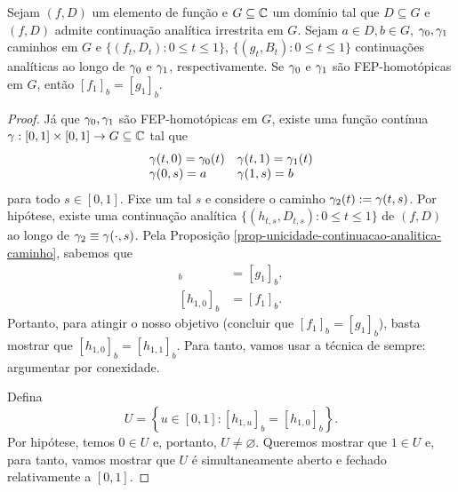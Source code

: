     \begin{teorema}
    \label{teo-monodromia}
        Sejam $(f,D)$ um elemento de função e $G\subseteq\mathbb{C}$ um domínio tal que 
        $D\subseteq G$ e $(f,D)$ admite continuação analítica irrestrita em $G$. Sejam
        $a\in D, b\in G$, $\gamma_0, \gamma_1$ caminhos em $G$ e 
        $\{ (f_t, D_t) : 0\leq t\leq 1 \}$, $\{ (g_t, B_t) : 0\leq t\leq 1 \}$ continuações
        analíticas ao longo de $\gamma_0$ e $\gamma_1$, respectivamente. 
        Se $\gamma_0$ e $\gamma_1$ são FEP-homotópicas em $G$, então $[f_1]_b = [g_1]_b$.
    \end{teorema}

    \begin{proof}
        Já que $\gamma_0, \gamma_1$ são FEP-homotópicas em $G$, existe uma função contínua
        $\gamma: [0,1]\times[0,1]\to G\subseteq\mathbb{C}$ tal que
        $$
          \begin{array}{ll}
            \gamma(t,0) = \gamma_0(t) & \gamma(t,1) = \gamma_1(t) \\
            \gamma(0,s) = a       & \gamma(1,s) = b
          \end{array}
        $$
        para todo $s\in [0,1]$. Fixe um tal $s$ e considere o caminho 
        $\gamma_2(t) := \gamma(t,s)$. Por hipótese, existe uma continuação analítica
        $\{ (h_{t,s}, D_{t,s}) : 0\leq t\leq 1 \}$ de $(f,D)$ ao longo de 
        $\gamma_2 \equiv \gamma(\cdot, s)$. Pela 
        Proposição \ref{prop-unicidade-continuacao-analitica-caminho}, sabemos que
        \begin{align*}
            [h_{1,1}]_b &= [g_1]_b, \\
            [h_{1,0}]_b &= [f_1]_b.
        \end{align*}
        Portanto, para atingir o nosso objetivo (concluir que $[f_1]_b = [g_1]_b$),
        basta mostrar que $[h_{1,0}]_b = [h_{1,1}]_b$. Para tanto, vamos usar a técnica
        de sempre: argumentar por conexidade.
        
        Defina
        \begin{equation*}
            U = \left\{ u\in [0,1] : [h_{1,u}]_b = [h_{1,0}]_b \right\}.
        \end{equation*}
        Por hipótese, temos $0\in U$ e, portanto, $U\neq\varnothing$. Queremos mostrar que
        $1\in U$ e, para tanto, vamos mostrar que $U$ é simultaneamente aberto e fechado
        relativamente a $[0,1]$.
        

\end{proof}
